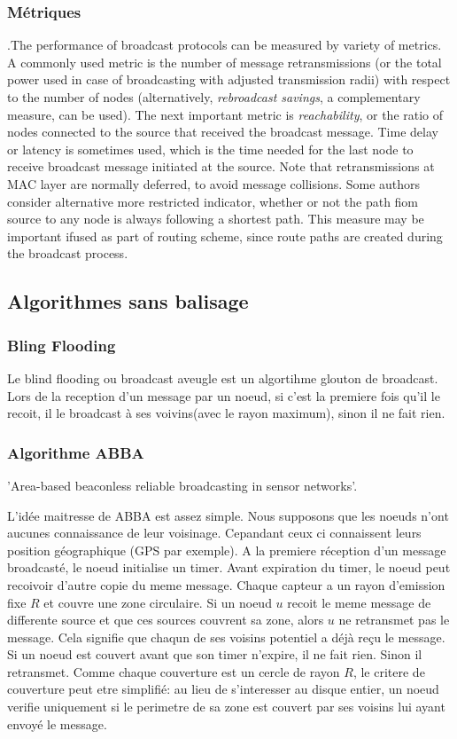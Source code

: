 \subsubsection{Métriques}.The performance of broadcast protocols can be measured by variety of metrics. A commonly used metric is the number of message retransmissions (or the total power used in case of broadcasting with adjusted 
transmission
 radii) with respect to the number of nodes (alternatively, {\it rebroadcast savings}, a complementary measure, can be used). The next important metric is {\it reachability}, or the ratio of nodes connected to the source
 that received the broadcast message. Time delay or latency is sometimes used, which is the time needed for the last node to receive broadcast message initiated at the source. Note that retransmissions at MAC layer are 
normally deferred, to avoid message collisions. Some authors consider alternative more restricted indicator, whether or not the path fiom source to any node is always following a shortest path. This measure may be important
 ifused as part of routing scheme, since route paths are created during the broadcast process.



\subsection{Algorithmes sans balisage}
\subsubsection{Bling Flooding}
Le blind flooding ou broadcast aveugle est un algortihme glouton de broadcast. Lors de la reception d'un message par un noeud, si c'est la premiere fois qu'il le recoit, il le broadcast à ses voivins(avec le rayon maximum), sinon il
 ne fait rien.
\subsubsection{Algorithme ABBA}
'Area-based beaconless reliable broadcasting in
sensor networks'\cite{Abba2006}.

L'idée maitresse de ABBA est assez simple. Nous supposons que les noeuds n'ont aucunes connaissance de leur voisinage. Cepandant ceux ci connaissent leurs position géographique (GPS par exemple).
A la premiere réception d'un message broadcasté, le noeud initialise un timer. Avant expiration du timer, le noeud peut recoivoir d'autre copie du meme message. Chaque capteur a un rayon d'emission fixe $R$
et couvre une zone circulaire. Si un noeud $u$ recoit le meme message de differente source et que ces sources couvrent sa zone, alors $u$ ne retransmet pas le message.
Cela signifie que chaqun de ses voisins potentiel a déjà reçu le message. Si un noeud est couvert avant que son timer n'expire, il ne fait rien. Sinon il retransmet.
Comme chaque couverture est un cercle de rayon $R$, le critere de couverture peut etre simplifié: au lieu de s'interesser au disque entier, un noeud verifie uniquement si le perimetre de sa zone est couvert par 
ses voisins lui ayant envoyé le message. 



